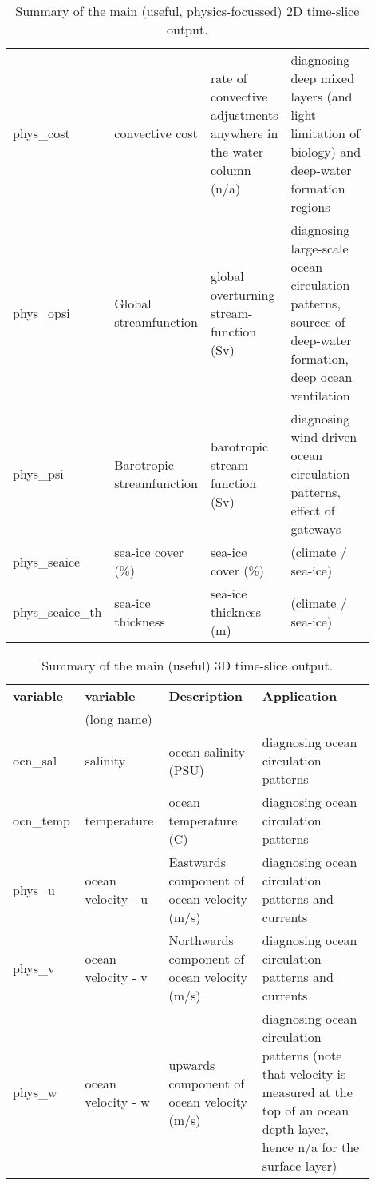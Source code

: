 \documentclass[11pt,fleqn]{book} %
\begin{document}
\begin{table}[ht]
\begin{tabular}{p{0.15\linewidth} p{0.20\linewidth} p{0.225\linewidth} p{0.325\linewidth}}
\textsf{\footnotesize phys\_cost} & \textsf{\footnotesize convective cost} & \small{rate of convective adjustments anywhere in the water column (n/a)} & \small{diagnosing deep mixed layers (and light limitation of biology) and deep-water formation regions}\\
\textsf{\footnotesize phys\_opsi} & \textsf{\footnotesize Global streamfunction} & \small{global overturning stream-function (Sv)} & \small{diagnosing large-scale ocean circulation patterns, sources of deep-water formation, deep ocean ventilation}\\
\textsf{\footnotesize phys\_psi} & \textsf{\footnotesize Barotropic streamfunction} & \small{barotropic stream-function (Sv)} & \small{diagnosing wind-driven ocean circulation patterns, effect of gateways}\\
\textsf{\footnotesize phys\_seaice} & \textsf{\footnotesize sea-ice cover (\%)} & \small{sea-ice cover (\%)} & \small{(climate / sea-ice)}\\
\textsf{\footnotesize phys\_seaice\_th} & \textsf{\footnotesize sea-ice thickness} & \small{sea-ice thickness (m)} & \small{(climate / sea-ice)}\\

\bottomrule
\end{tabular}
\caption{Summary of the main (useful, physics-focussed) 2D time-slice output.}
\end{table}

\begin{table}[ht]
\begin{tabular}{p{0.15\linewidth} p{0.20\linewidth} p{0.25\linewidth} p{0.3\linewidth}}
\toprule
\textbf{variable} & \textbf{variable} & \textbf{Description} & \textbf{Application}\\
 & (long name) & &\\
\midrule
\textsf{\footnotesize ocn\_sal} & \textsf{\footnotesize salinity} & \small{ocean salinity (PSU)} & \small{diagnosing ocean circulation patterns}\\
\textsf{\footnotesize ocn\_temp} & \textsf{\footnotesize temperature} & \small{ocean temperature (C)} & \small{diagnosing ocean circulation patterns}\\
\midrule
\textsf{\footnotesize phys\_u} & \textsf{\footnotesize ocean velocity - u} & \small{Eastwards component of ocean velocity (m/s)} & \small{diagnosing ocean circulation patterns and currents}\\
\textsf{\footnotesize phys\_v} & \textsf{\footnotesize ocean velocity - v} & \small{Northwards component of ocean velocity} (m/s) & \small{diagnosing ocean circulation patterns and currents}\\
\textsf{\footnotesize phys\_w} & \textsf{\footnotesize ocean velocity - w} & \small{upwards component of ocean velocity (m/s)} & \small{diagnosing ocean circulation patterns (note that velocity is measured at the top of an ocean depth layer, hence n/a for the surface layer)}\\
\bottomrule
\end{tabular}
\caption{Summary of the main (useful) 3D time-slice output.}
\end{table}
\end{document}
